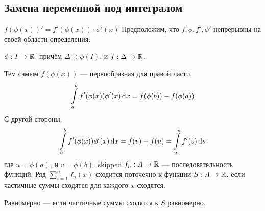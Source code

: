 \documentclass[a4paper]{report}
\begin{document}
    \subsection{Замена переменной под интегралом}
    $f(\phi(x))' = f'(\phi(x)) \cdot \phi'(x)$
    Предположим, что $f, \phi, f', \phi'$ непрерывны на своей области определения:

    $\phi: I \rightarrow \mathbb{R}$, причём $\Delta \supset\phi(I)$, и $f: \Delta \rightarrow \mathbb{R}$.

    Тем самым $f(\phi(x))$ --- первообразная для правой части.
    \[\int\limits_a^b f'(\phi(x))\phi'(x) \operatorname{d}\! x = f(\phi(b)) - f(\phi(a))\]
    С другой стороны, \[\int\limits_a^bf'(\phi(x))\phi'(x) \operatorname{d}\! x = f(v) - f(u) = \int\limits_u^v f'(s) \operatorname{d}\! s\]
    где $u = \phi(a)$, и $v = \phi(b)$.
    skipped
    $f_n: A \rightarrow \mathbb{R}$ --- последовательность функций.
    Ряд $\sum\limits_{i = 1}^{n}f_n(x)$ сходится поточечно к функции $S: A \rightarrow \mathbb{R}$, если частичные суммы сходятся для каждого $x$ сходятся.

    Равномерно --- если частичные суммы сходятся к $S$ равномерно.
\end{document}
